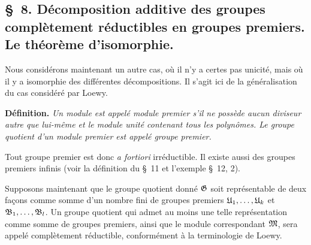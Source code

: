 \subsection*{\S~8. Décomposition additive des groupes complètement réductibles en groupes premiers. Le théorème d'isomorphie.}

Nous considérons maintenant un autre cas, où il n'y a certes pas unicité, mais où il y a isomorphie des différentes décompositions. Il s'agit ici de la généralisation du cas considéré par Loewy.

\textbf{Définition.} \emph{Un module est appelé module premier s'il ne possède aucun diviseur autre que lui-même et le module unité contenant tous les polynômes. Le groupe quotient d'un module premier est appelé groupe premier.}

Tout groupe premier est donc \emph{a fortiori} irréductible. Il existe aussi des groupes premiers infinis (voir la définition du \S~11 et l'exemple \S~12, 2).

Supposons maintenant que le groupe quotient donné $\mathfrak{G}$ soit représentable de deux façons comme somme d'un nombre fini de groupes premiers $\mathfrak{U}_1,\ldots,\mathfrak{U}_k$ et $\mathfrak{B}_1,\ldots,\mathfrak{B}_l$. Un groupe quotient qui admet au moins une telle représentation comme somme de groupes premiers, ainsi que le module correspondant $\mathfrak{M}$, sera appelé complètement réductible, conformément à la terminologie de Loewy.

